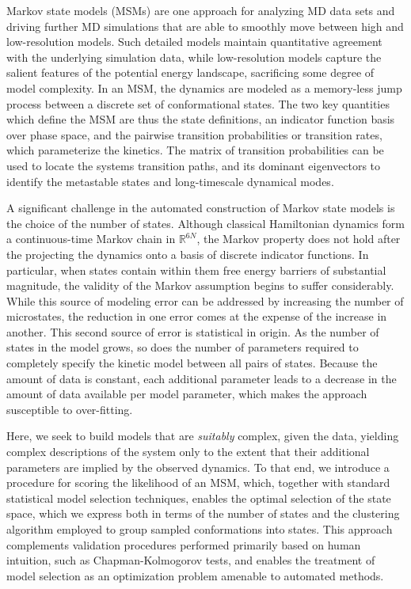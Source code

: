 \documentclass[journal=jpcbfk, layout=twocolumn, manuscript=article]{achemso}
\begin{document}
Markov state models (MSMs) are one approach for analyzing MD data sets and driving further MD simulations that are able to smoothly move between high and low-resolution models\cite{Pande2010Everything, Beauchamp2012Simple, Prinz2011Markov, Bowman2013Quantitative}. Such detailed models maintain quantitative agreement with the underlying simulation data, while low-resolution models capture the salient features of the potential energy landscape, sacrificing some degree of model complexity. In an MSM, the dynamics are modeled as a memory-less jump process between a discrete set of conformational states. The two key quantities which define the MSM are thus the state definitions, an indicator function basis over phase space, and the pairwise transition probabilities or transition rates, which parameterize the kinetics. The matrix of transition probabilities can be used to locate the systems transition paths\cite{Weinan2006Towards}, and its dominant eigenvectors to identify the metastable states\cite{Deuflhard2000Identification} and long-timescale dynamical modes\cite{}. 

A significant challenge in the automated construction of Markov state models is the choice of the number of states\cite{McGibbon2013Learning}. Although classical Hamiltonian dynamics form a continuous-time Markov chain in $\mathbb{R}^{6N}$, the Markov property does not hold after the projecting the dynamics onto a basis of discrete indicator functions. In particular, when states contain within them free energy barriers of substantial magnitude, the validity of the Markov assumption begins to suffer considerably. While this source of modeling error can be addressed by increasing the number of microstates, the reduction in one error comes at the expense of the increase in another. This second source of error is statistical in origin. As the number of states in the model grows, so does the number of parameters required to completely specify the kinetic model between all pairs of states. Because the amount of data is constant, each additional parameter leads to a decrease in the amount of data available per model parameter, which makes the approach susceptible to over-fitting.

Here, we seek to build models that are \emph{suitably} complex, given the data, yielding complex descriptions of the system only to the extent that their additional parameters are implied by the observed dynamics. To that end, we introduce a procedure for scoring the likelihood of an MSM, which, together with standard statistical model selection techniques, enables the optimal selection of the state space, which we express both in terms of the number of states and the clustering algorithm employed to group sampled conformations into states. This approach complements validation procedures performed primarily based on human intuition, such as Chapman-Kolmogorov tests, and enables the treatment of model selection as an optimization problem amenable to automated methods.
\end{document}

